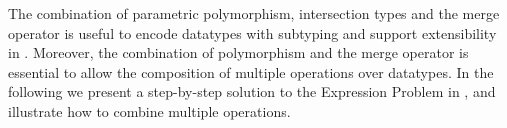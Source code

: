 The combination of parametric polymorphism, intersection types and the
merge operator is useful to encode datatypes with subtyping and
support extensibility in \name. Moreover, the combination of
polymorphism and the merge operator is essential to allow the
composition of multiple operations over datatypes. In the following
we present a step-by-step solution to the Expression Problem in \name,
and illustrate how to combine multiple operations.

\begin{comment}
Oliveira and Cook~\cite{oliveira2012extensibility} proposed a design pattern that can solve the
Expression Problem in languages like Java. An advantage of the pattern
over previous solutions is that it is relatively lightweight in terms
of type system features. In a latter paper, Oliveira et al.~\cite{oliveira2013feature}
noted some limitations of the original design pattern and proposed
some new techniques that generalized the original pattern, allowing it
to express programs in a Feature-Oriented Programming~\cite{Prehofer97} style.
Key to these techniques was the ability to dynamically compose object
algebras.

Unfortunatelly, dynamic composition of object algebras is
non-trivial. At the type-level it is possible to express the resulting
type of the composition using intersection types. Thus, it is still
possible to solve that part problem nicely in a language like Scala (which
has basic support for intersection types). However, the dynamic
composition itself cannot be easily encoded in Scala. The fundamental
issue is that Scala lacks a \lstinline{merge} operator (see the
discussion in Section~\ref{subsec:interScala}). Although both Oliveira et al.~\cite{oliveira2013feature} and
Rendell et al.~\cite{rendel14attributes} have shown that such a \lstinline{merge} operator can
be encoded in Scala, the encoding fundamentally relies in low-level
programming techniques such as dynamic proxies, reflection or
meta-programming.

Because \name supports a \lstinline{merge} operator natively, dynamic
object algebra composition becomes easy to encode. The remainder of
this section shows how object algebras and object algebra composition
can be encoded in \name. We will illustrate this point
step-by-step by solving the Expression Problem.
\end{comment}



